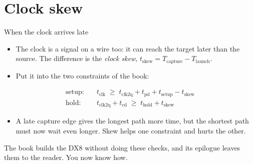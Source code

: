 \documentclass[10pt]{wosm-slides}
\begin{document}
\section{Clock skew}

\begin{frame}{When the clock arrives late}
  \begin{itemize}
    \item The clock is a signal on a wire too: it can reach the target later than
      the source. The difference is the \emph{clock skew},
      $t_{\mathrm{skew}} = T_{\mathrm{capture}} - T_{\mathrm{launch}}$.
    \item Put it into the two constraints of the book:
  \end{itemize}
  \begin{align*}
    \text{setup:}\quad & t_{\mathrm{clk}} \;\ge\; t_{\mathrm{clk2q}} + t_{\mathrm{pd}}
      + t_{\mathrm{setup}} - t_{\mathrm{skew}} \\
    \text{hold:}\quad & t_{\mathrm{clk2q}} + t_{\mathrm{cd}} \;\ge\;
      t_{\mathrm{hold}} + t_{\mathrm{skew}}
  \end{align*}
  \begin{itemize}
    \item A late capture edge gives the longest path more time, but the shortest
      path must now wait even longer. Skew helps one constraint and hurts the other.
  \end{itemize}

  \begin{remark}
    The book builds the DX8 without doing these checks, and its epilogue leaves them
    to the reader. You now know how.
  \end{remark}
\end{frame}
\end{document}
